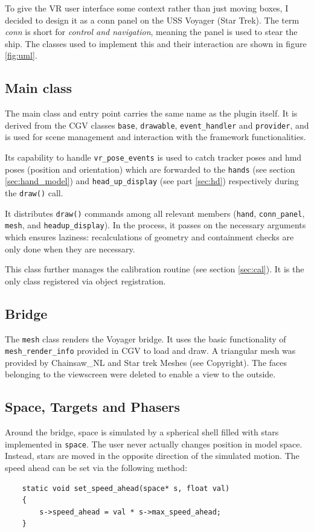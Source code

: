 \documentclass[hyperref, bachelorofscience]{cgvpub}
\begin{document}
To give the VR user interface some context rather than just moving boxes, I decided to design it as a conn panel on the USS Voyager (Star Trek). The term \emph{conn} is short for \emph{control and navigation}, meaning the panel is used to stear the ship. The classes used to implement this and their interaction are shown in figure \ref{fig:uml}.

\subsection{Main class}
The main class and entry point carries the same name as the plugin itself. It is derived from the \gls{CGV} classes \lstinline|base|, \lstinline|drawable|, \lstinline|event_handler| and \lstinline|provider|, and is used for scene management and interaction with the framework functionalities.

Its capability to handle \lstinline|vr_pose_events| is used to catch tracker poses and \acrshort{hmd} poses (position and orientation) which are forwarded to the \lstinline|hands| (see section \ref{sec:hand_model}) and \lstinline|head_up_display| (see part \ref{sec:hd}) respectively during the \lstinline|draw()| call. 

It distributes \lstinline|draw()| commands among all relevant members (\lstinline|hand|, \lstinline|conn_panel|, \lstinline|mesh|, and \lstinline|headup_display|). In the process, it passes on the necessary arguments which ensures laziness: recalculations of geometry and containment checks are only done when they are necessary.

This class further manages the calibration routine (see section \ref{sec:cal}). It is the only class registered via object registration.

\subsection{Bridge}
The \lstinline|mesh| class renders the Voyager bridge. It uses the basic functionality of \lstinline|mesh_render_info| provided in \gls{CGV} to load and draw. A triangular mesh was provided by Chainsaw\_NL and Star trek Meshes (see Copyright). The faces belonging to the viewscreen were deleted to enable a view to the outside.

\subsection{Space, Targets and Phasers}
Around the bridge, space is simulated by a spherical shell filled with stars implemented in \lstinline|space|. The user never actually changes position in model space. Instead, stars are moved in the opposite direction of the simulated motion. The speed ahead can be set via the following method: 
\begin{lstlisting}
	static void set_speed_ahead(space* s, float val) 
	{ 
		s->speed_ahead = val * s->max_speed_ahead; 
	}
\end{lstlisting}
\end{document}
